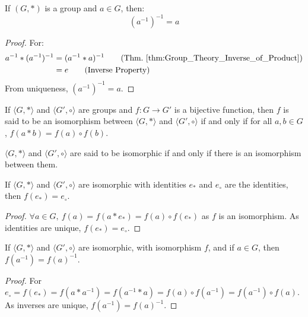         \begin{theorem}
            If $(G,*)$ is a group and $a\in{G}$, then:
            \begin{equation}
                (a^{-1})^{-1}=a
            \end{equation}
        \end{theorem}
        \begin{proof}
            For:
            \begin{align}
                a^{-1}*(a^{-1})^{-1}
                &=(a^{-1}* a)^{-1}
                \tag{Thm.~\ref{thm:Group_Theory_Inverse_of_Product}}\\
                &=e
                \tag{Inverse Property}
            \end{align}
            From uniqueness, $(a^{-1})^{-1}=a$.
        \end{proof}
        \begin{definition}
        If $\langle G, * \rangle$ and $\langle G',\circ \rangle$ are groups and $f:G\rightarrow G'$ is a bijective function, then $f$ is said to be an isomorphism between $\langle G, * \rangle$ and $\langle G',\circ \rangle$ if and only if for all $a,b\in G$, $f(a*b) =f(a)\circ f(b)$.
        \end{definition}
        \begin{definition}
        $\langle G, *\rangle$ and $\langle G', \circ \rangle$ are said to be isomorphic if and only if there is an isomorphism between them.
        \end{definition}
        \begin{theorem}
        If $\langle G, * \rangle$ and $\langle G', \circ \rangle$ are isomorphic with identities $e_*$ and $e_{\circ}$ are the identities, then $f(e_*) = e_{\circ}$.
        \end{theorem}
        \begin{proof}
        $\forall a\in G,\ f(a)=f(a* e_*) = f(a)\circ f(e_*)$ as $f$ is an isomorphism. As identities are unique, $f(e_*) = e_{\circ}$.
        \end{proof}
        \begin{theorem}
        If $\langle G, * \rangle$ and $\langle G', \circ \rangle$ are isomorphic, with isomorphism $f$, and if $a\in G$, then $f(a^{-1}) = f(a)^{-1}$.
        \end{theorem}
        \begin{proof}
        For $e_{\circ}=f(e_*) = f(a*a^{-1}) = f(a^{-1}*a) = f(a)\circ f(a^{-1})=f(a^{-1})\circ f(a)$. As inverses are unique, $f(a^{-1})=f(a)^{-1}$.
        \end{proof}
